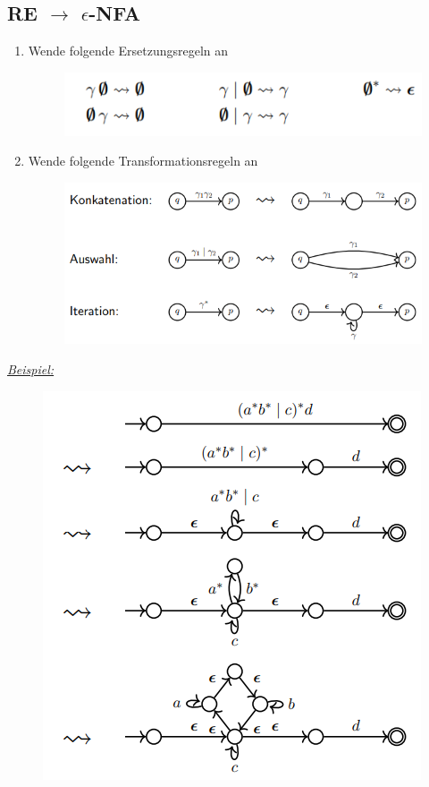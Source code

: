 \documentclass[ieeetran]{article}
\begin{document}
\pagebreak
\subsection{RE $\rightarrow$ $\epsilon$-NFA} %
\label{sub:rE_rightarrow_epsilon_nFA}
\begin{enumerate}
	\item Wende folgende Ersetzungsregeln an
		\begin{figure}[h!]
		  \centering
		  \includegraphics[width=0.8\linewidth]{ersetzungretonfa.png}
		  \label{fig:ersetzungretonfa_png}
		\end{figure}

\item Wende folgende Transformationsregeln an
	\begin{figure}[h!]
	  \centering
	  \includegraphics[width=0.8\linewidth]{transformationsregel.png}
	  \label{fig:transformationsregel_png}
	\end{figure}
\end{enumerate}

\textit{\underline{Beispiel:}}
\begin{figure}[h!]
  \centering
  \includegraphics[width=0.5\linewidth]{retonfabeispiel.png}
  \label{fig:retonfabeispiel_png}
\end{figure}
\pagebreak
\end{document}
